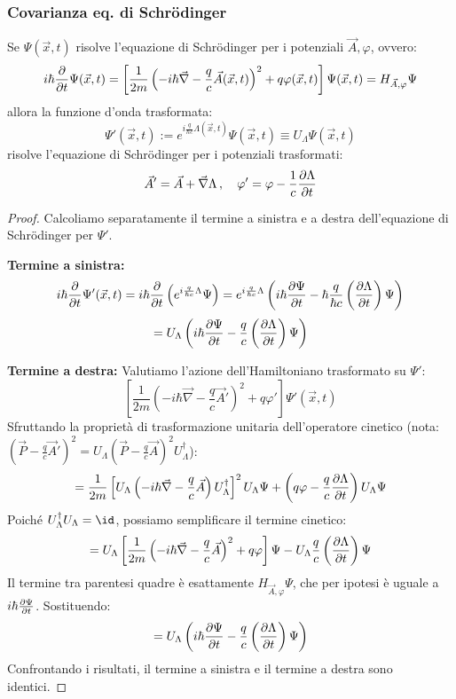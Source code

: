 \subsubsection{Covarianza eq. di Schrödinger}
Se \( \Psi(\vec{x},t) \) risolve l'equazione di Schrödinger per i potenziali \( \vec{A}, \varphi \), ovvero:
\[
i\hbar \pdv{t} \Psi(\vec{x},t) = \left[ \frac{1}{2m} \left( -i\hbar\vec{\nabla} - \frac{q}{c}\vec{A}(\vec{x},t) \right)^2 + q\varphi(\vec{x},t) \right] \Psi(\vec{x},t) = H_{\vec{A},\varphi} \Psi
\]
allora la funzione d'onda trasformata:
\[
\Psi'(\vec{x},t) := e^{i\frac{q}{\hbar c}\Lambda(\vec{x},t)} \Psi(\vec{x},t) \equiv U_{\Lambda} \Psi(\vec{x},t)
\]
risolve l'equazione di Schrödinger per i potenziali trasformati:
\[
\vec{A}' = \vec{A} + \vec{\nabla}\Lambda \,,\quad \varphi' = \varphi - \frac{1}{c}\pdv{\Lambda}{t}
\]

\begin{proof}
    Calcoliamo separatamente il termine a sinistra e a destra dell'equazione di Schrödinger per \( \Psi' \).

    \textbf{Termine a sinistra:}
    \[
    i\hbar \pdv{t} \Psi'(\vec{x},t) = i\hbar \pdv{t} \left( e^{i\frac{q}{\hbar c}\Lambda} \Psi \right)
    = e^{i\frac{q}{\hbar c}\Lambda} \left( i\hbar \pdv{\Psi}{t} - \hbar \frac{q}{\hbar c} \left(\pdv{\Lambda}{t}\right) \Psi \right)
    \]
    \[
    = U_{\Lambda} \left( i\hbar \pdv{\Psi}{t} - \frac{q}{c} \left(\pdv{\Lambda}{t}\right) \Psi \right)
    \]

    \textbf{Termine a destra:}
    Valutiamo l'azione dell'Hamiltoniano trasformato su \( \Psi' \):
    \[
    \left[ \frac{1}{2m} \left( -i\hbar\vec{\nabla} - \frac{q}{c}\vec{A}' \right)^2 + q\varphi' \right] \Psi'(\vec{x},t)
    \]
    Sfruttando la proprietà di trasformazione unitaria dell'operatore cinetico (nota: \( (\vec{P}-\frac{q}{c}\vec{A}')^2 = U_{\Lambda} (\vec{P}-\frac{q}{c}\vec{A})^2 U_{\Lambda}^{\dagger} \)):
    \[
    = \frac{1}{2m} \left[ U_{\Lambda} \left( -i\hbar\vec{\nabla} - \frac{q}{c}\vec{A} \right) U_{\Lambda}^{\dagger} \right]^2 U_{\Lambda} \Psi + \left( q\varphi - \frac{q}{c}\pdv{\Lambda}{t} \right) U_{\Lambda} \Psi
    \]
    Poiché \( U_{\Lambda}^{\dagger} U_{\Lambda} = \id \), possiamo semplificare il termine cinetico:
    \[
    = U_{\Lambda} \left[ \frac{1}{2m} \left( -i\hbar\vec{\nabla} - \frac{q}{c}\vec{A} \right)^2 + q\varphi \right] \Psi - U_{\Lambda} \frac{q}{c} \left(\pdv{\Lambda}{t}\right) \Psi
    \]
    Il termine tra parentesi quadre è esattamente \( H_{\vec{A},\varphi} \Psi \), che per ipotesi è uguale a \( i\hbar \pdv{\Psi}{t} \). Sostituendo:
    \[
    = U_{\Lambda} \left( i\hbar \pdv{\Psi}{t} - \frac{q}{c} \left(\pdv{\Lambda}{t}\right) \Psi \right)
    \]
    Confrontando i risultati, il termine a sinistra e il termine a destra sono identici.
\end{proof}

